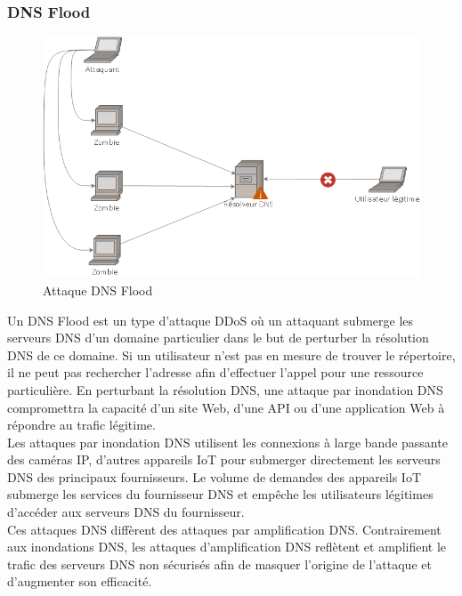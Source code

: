 	\subsubsection{DNS Flood}
	\begin{figure}[h]
		\begin{center}
			\includegraphics[width=\textwidth]{IMAGES/ORIGINALS/Attaque_DNS_Flood}
		\end{center}
		\caption{Attaque DNS Flood}
	\end{figure}

	Un DNS Flood est un type d'attaque DDoS où un attaquant submerge les serveurs DNS d'un domaine particulier dans le but de perturber la résolution DNS de ce domaine. Si un utilisateur n'est pas en mesure de trouver le répertoire, il ne peut pas rechercher l'adresse afin d'effectuer l'appel pour une ressource particulière. En perturbant la résolution DNS, une attaque par inondation DNS compromettra la capacité d'un site Web, d'une API ou d'une application Web à répondre au trafic légitime.\\

	Les attaques par inondation DNS utilisent les connexions à large bande passante des caméras IP, d'autres appareils IoT pour submerger directement les serveurs DNS des principaux fournisseurs. Le volume de demandes des appareils IoT submerge les services du fournisseur DNS et empêche les utilisateurs légitimes d'accéder aux serveurs DNS du fournisseur.\\

	Ces attaques DNS diffèrent des attaques par amplification DNS. Contrairement aux inondations DNS, les attaques d'amplification DNS reflètent et amplifient le trafic des serveurs DNS non sécurisés afin de masquer l'origine de l'attaque et d'augmenter son efficacité.

